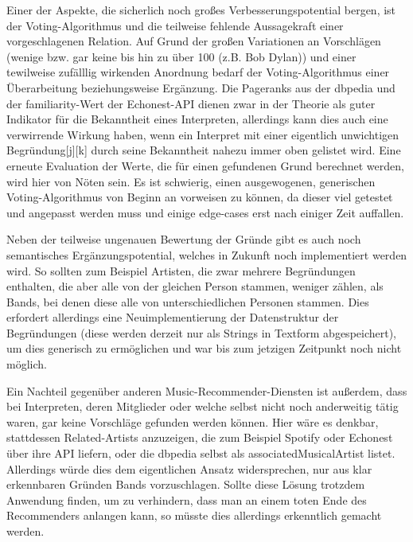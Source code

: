 Einer der Aspekte, die sicherlich noch großes Verbesserungspotential bergen, ist der Voting-Algorithmus und die teilweise fehlende Aussagekraft einer vorgeschlagenen Relation. Auf Grund der großen Variationen an Vorschlägen (wenige bzw. gar keine bis hin zu über 100 (z.B. Bob Dylan)) und einer tewilweise zufälllig wirkenden Anordnung bedarf der Voting-Algorithmus einer Überarbeitung beziehungsweise Ergänzung. Die Pageranks aus der dbpedia und der familiarity-Wert der Echonest-API dienen zwar in der Theorie als guter Indikator für die Bekanntheit eines Interpreten, allerdings kann dies auch eine verwirrende Wirkung haben, wenn ein Interpret mit einer eigentlich unwichtigen Begründung[j][k] durch seine Bekanntheit nahezu immer oben gelistet wird. Eine erneute Evaluation der Werte, die für einen gefundenen Grund berechnet werden, wird hier von Nöten sein. Es ist schwierig, einen ausgewogenen, generischen Voting-Algorithmus von Beginn an vorweisen zu können, da dieser viel getestet und angepasst werden muss und einige edge-cases erst nach einiger Zeit auffallen.


Neben der teilweise ungenauen Bewertung der Gründe gibt es auch noch semantisches Ergänzungspotential, welches in Zukunft noch implementiert werden wird. So sollten zum Beispiel Artisten, die zwar mehrere Begründungen enthalten, die aber alle von der gleichen Person stammen, weniger zählen, als Bands, bei denen diese alle von unterschiedlichen Personen stammen. Dies erfordert allerdings eine Neuimplementierung der Datenstruktur der  Begründungen (diese werden derzeit nur als Strings in Textform abgespeichert), um dies generisch zu ermöglichen und war bis zum jetzigen Zeitpunkt noch nicht möglich.


Ein Nachteil gegenüber anderen Music-Recommender-Diensten ist außerdem, dass bei Interpreten, deren Mitglieder oder welche selbst nicht noch anderweitig tätig waren, gar keine Vorschläge gefunden werden können. Hier wäre es denkbar, stattdessen Related-Artists anzuzeigen, die zum Beispiel Spotify oder Echonest über ihre API liefern, oder die dbpedia selbst als associatedMusicalArtist listet. Allerdings würde dies dem eigentlichen Ansatz widersprechen, nur aus klar erkennbaren Gründen Bands vorzuschlagen. Sollte diese Lösung trotzdem Anwendung finden, um zu verhindern, dass man an einem toten Ende des Recommenders anlangen kann, so müsste dies allerdings erkenntlich gemacht werden.


